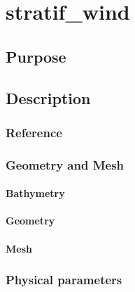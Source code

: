 \chapter{stratif\_wind}
%
%
\section{Purpose}
%

%
\section{Description}
%
%
%
%
\subsection{Reference}
%

%
%
%
\subsection{Geometry and Mesh}
%
\subsubsection{Bathymetry}
%

%
\subsubsection{Geometry}
%

%
\subsubsection{Mesh}
%

%
%
%
\subsection{Physical parameters}
%

